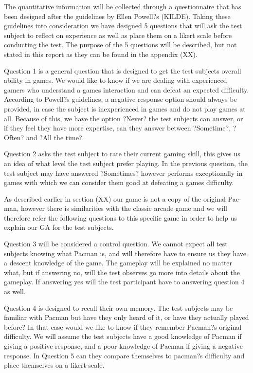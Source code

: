 The quantitative information will be collected through a questionnaire that has been designed after the guidelines by Ellen Powell?s (KILDE). Taking these guidelines into consideration we have designed 5 questions that will ask the test subject to reflect on experience as well as place them on a likert scale before conducting the test. The purpose of the 5 questions will be described, but not stated in this report as they can be found in the appendix (XX).

Question 1 is a general question that is designed to get the test subjects overall ability in games. We would like to know if we are dealing with experienced gamers who understand a games interaction and can defeat an expected difficulty.
According to Powell?s guidelines, a negative response option should always be provided, in case the subject is inexperienced in games and do not play games at all. Because of this, we have the option ?Never? the test subjects can answer, or if they feel they have more expertise, can they answer between ?Sometime?, ?Often? and ?All the time?.

Question 2 asks the test subject to rate their current gaming skill, this gives us an idea of what level the test subject prefer playing. In the previous question, the test subject may have answered ?Sometimes? however performs exceptionally in games with which we can consider them good at defeating a games difficulty.

As described earlier in section (XX) our game is not a copy of the original Pac-man, however there is similarities with the classic arcade game and we will therefore refer the following questions to this specific game in order to help us explain our GA for the test subjects.

Question 3 will be considered a control question. We cannot expect all test subjects knowing what Pacman is, and will therefore have to ensure us they have a descent knowledge of the game. The gameplay will be explained no matter what, but if answering no, will the test observes go more into details about the gameplay. If answering yes will the test participant have to answering question 4 as well.

Question 4 is designed to recall their own memory. The test subjects may be familiar with Pacman but have they only heard of it, or have they actually played before? In that case would we like to know if they remember Pacman?s original difficulty. We will assume the test subjects have a good knowledge of Pacman if giving a positive response, and a poor knowledge of Pacman if giving a negative response. In Question 5 can they compare themselves to pacman?s difficulty and place themselves on a likert-scale.

